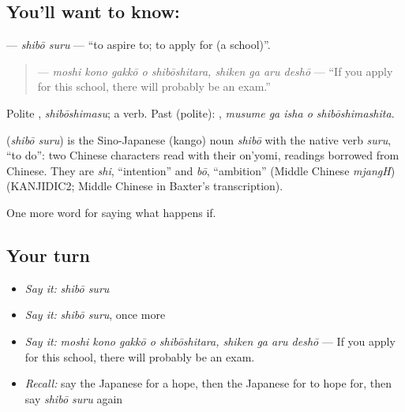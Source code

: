 \subsection*{You'll want to know: }
\textbf{} — \emph{shibō suru} — \textquotedblleft{}to aspire to; to apply for (a school)\textquotedblright{}.

\begin{quote}
\textbf{    } — \emph{moshi kono gakkō o shibōshitara, shiken ga aru deshō} — \textquotedblleft{}If you apply for this school, there will probably be an exam.\textquotedblright{}
\end{quote}

Polite \textbf{}, \emph{shibōshimasu}; a  verb. Past (polite): \textbf{  }, \emph{musume ga isha o shibōshimashita}.

\begin{cousinweb}
\textbf{} (\emph{shibō suru}) is the Sino-Japanese (kango) noun \emph{shibō} with the native verb \emph{suru}, \textquotedblleft{}to do\textquotedblright{}: two Chinese characters read with their on'yomi, readings borrowed from Chinese. They are \emph{shi}, \textquotedblleft{}intention\textquotedblright{} and \emph{bō}, \textquotedblleft{}ambition\textquotedblright{} (Middle Chinese \emph{mjangH}) (KANJIDIC2; Middle Chinese in Baxter's transcription).
\end{cousinweb}

\begin{grammarlens}[title={What you've built}]
One more word for saying what happens if.
\end{grammarlens}

\subsection*{Your turn}
\begin{itemize}
\raggedright
  \item \emph{Say it:} \emph{shibō suru}
  \item \emph{Say it:} \emph{shibō suru}, once more
  \item \emph{Say it:} \emph{moshi kono gakkō o shibōshitara, shiken ga aru deshō} — If you apply for this school, there will probably be an exam.
  \item \emph{Recall:} say the Japanese for a hope, then the Japanese for to hope for, then say \emph{shibō suru} again
\end{itemize}

